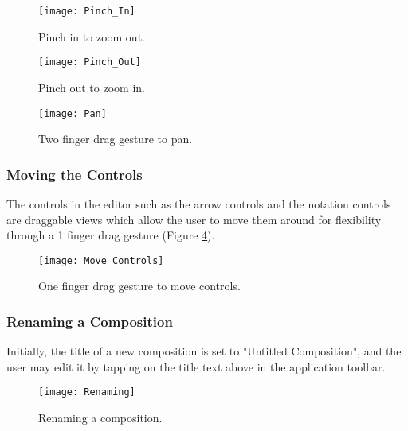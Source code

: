 \begin{figure}[H]
	\centering
	\texttt{[image: Pinch\_In]}
    \caption{Pinch in to zoom out.}
    \label{fig:pinch-in}
\end{figure}

\begin{figure}[H]
	\centering
	\texttt{[image: Pinch\_Out]}
    \caption{Pinch out to zoom in.}
    \label{fig:pinch-out}
\end{figure}

\begin{figure}[H]
	\centering
	\texttt{[image: Pan]}
    \caption{Two finger drag gesture to pan.}
    \label{fig:pan}
\end{figure}

\subsubsection{Moving the Controls}
The controls in the editor such as the arrow controls and the notation controls are draggable views which allow the user to move them around for flexibility through a 1 finger drag gesture (Figure \ref{fig:move-controls}).

\begin{figure}[H]
	\centering
	\texttt{[image: Move\_Controls]}
    \caption{One finger drag gesture to move controls.}
    \label{fig:move-controls}
\end{figure}

\subsubsection{Renaming a Composition}
Initially, the title of a new composition is set to "Untitled Composition", and the user may edit it by tapping on the title text above in the application toolbar. 

\begin{figure}[H]
	\centering
	\texttt{[image: Renaming]}
    \caption{Renaming a composition.}
    \label{fig:renaming}
\end{figure}

